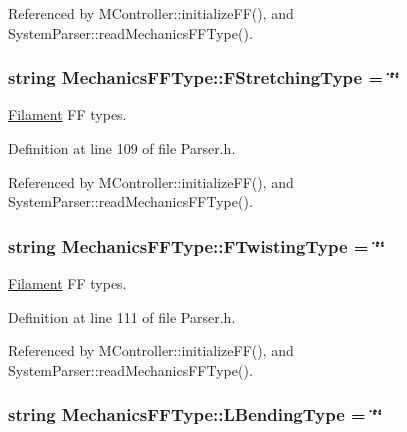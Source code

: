 Referenced by M\+Controller\+::initialize\+F\+F(), and System\+Parser\+::read\+Mechanics\+F\+F\+Type().

\hypertarget{structMechanicsFFType_ad887670c75c1e05b77187cdae1c849fa}{
\subsubsection[{F\+Stretching\+Type}]{\setlength{\rightskip}{0pt plus 5cm}string Mechanics\+F\+F\+Type\+::\+F\+Stretching\+Type = \char`\"{}\char`\"{}}}\label{structMechanicsFFType_ad887670c75c1e05b77187cdae1c849fa}


\hyperlink{classFilament}{Filament} F\+F types. 



Definition at line 109 of file Parser.\+h.



Referenced by M\+Controller\+::initialize\+F\+F(), and System\+Parser\+::read\+Mechanics\+F\+F\+Type().

\hypertarget{structMechanicsFFType_a7cde64b003b7a90a9f3fa13b5dbe573f}{
\subsubsection[{F\+Twisting\+Type}]{\setlength{\rightskip}{0pt plus 5cm}string Mechanics\+F\+F\+Type\+::\+F\+Twisting\+Type = \char`\"{}\char`\"{}}}\label{structMechanicsFFType_a7cde64b003b7a90a9f3fa13b5dbe573f}


\hyperlink{classFilament}{Filament} F\+F types. 



Definition at line 111 of file Parser.\+h.



Referenced by M\+Controller\+::initialize\+F\+F(), and System\+Parser\+::read\+Mechanics\+F\+F\+Type().

\hypertarget{structMechanicsFFType_a14852de6199812e5e6c646f2a8479aac}{
\subsubsection[{L\+Bending\+Type}]{\setlength{\rightskip}{0pt plus 5cm}string Mechanics\+F\+F\+Type\+::\+L\+Bending\+Type = \char`\"{}\char`\"{}}}\label{structMechanicsFFType_a14852de6199812e5e6c646f2a8479aac}


